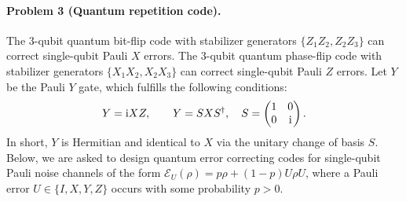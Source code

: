 \documentclass[catalan,spanish,english]{exam}
\begin{document}
\paragraph{Problem 3 (Quantum repetition code).} The 3-qubit quantum bit-flip code with stabilizer generators $\{ Z_1Z_2, Z_2Z_3\}$ can correct single-qubit Pauli $X$ errors. The 3-qubit quantum phase-flip code with stabilizer generators $\{ X_1X_2, X_2X_3\}$ can correct single-qubit Pauli $Z$ errors. Let $Y$ be the Pauli $Y$ gate, which fulfills the following conditions:
\begin{equation}
    Y=\textnormal{i}XZ, \qquad  Y=S X S^\dagger, \quad S=
    \begin{pmatrix}
        1 & 0 \\ 
        0 & \textnormal{i}
    \end{pmatrix}.
\end{equation}
In short, $Y$ is Hermitian and  identical to $X$ via the unitary change of basis $S$. Below, we are asked to design quantum error correcting codes   for single-qubit Pauli noise channels of the form  $\mathcal{E}_U(\rho)= p \rho + (1-p) U \rho U $, where a Pauli error  $U\in \{I, X, Y, Z\}$ occurs with some probability $p>0$.
\end{document}
